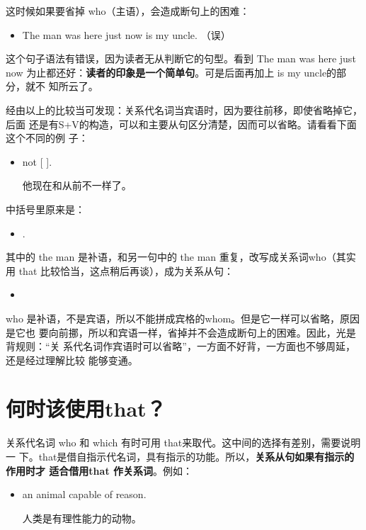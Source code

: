 这时候如果要省掉 who（主语），会造成断句上的困难：
\begin{itemize}
\item The man was here just now is my uncle. （误）
\end{itemize}

这个句子语法有错误，因为读者无从判断它的句型。看到 The man was here just now
为止都还好：\textbf{读者的印象是一个简单句}。可是后面再加上 is my uncle的部分，就不
知所云了。

经由以上的比较当可发现：关系代名词当宾语时，因为要往前移，即使省略掉它，后面
还是有S+V的构造，可以和主要从句区分清楚，因而可以省略。请看看下面这个不同的例
子：
\begin{itemize}
\item {}  not  [
  ].

  他现在和从前不一样了。
\end{itemize}

中括号里原来是：
\begin{itemize}
\item {}  .
\end{itemize}
其中的 the man 是补语，和另一句中的 the man 重复，改写成关系词who（其实
用 that 比较恰当，这点稍后再谈），成为关系从句：
\begin{itemize}
\item {}  
\end{itemize}

who 是补语，不是宾语，所以不能拼成宾格的whom。但是它一样可以省略，原因是它也
要向前挪，所以和宾语一样，省掉并不会造成断句上的困难。因此，光是背规则：“关
系代名词作宾语时可以省略”，一方面不好背，一方面也不够周延，还是经过理解比较
能够变通。

\section{何时该使用that？}

关系代名词 who 和 which 有时可用 that来取代。这中间的选择有差别，需要说明一
下。that是借自指示代名词，具有指示的功能。所以，\textbf{关系从句如果有指示的作用时才
适合借用that 作关系词}。例如：

\begin{itemize}
\item {}  an animal  
  capable of reason.

  人类是有理性能力的动物。
\end{itemize}

